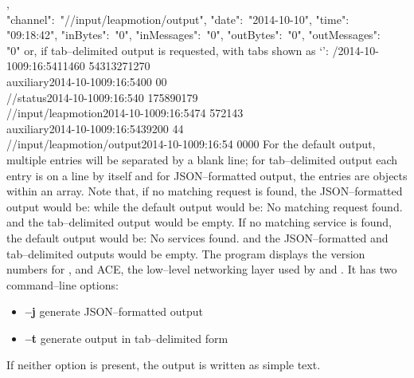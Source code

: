 \textbraceright,\\
\textbraceleft{} "channel":\ "/\serviceName/input/leapmotion/output", "date":\
"2014-10-10", "time":\ \\
"09:18:42", "inBytes":\ "0", "inMessages":\ "0", "outBytes":\ "0", "outMessages":\ \\
"0" \textbraceright{} \closeSq{} \closeSq
\outputEnd{}
or, if tab--delimited output is requested, with tabs shown as
`\texttt{\boldmath{$\vdash$}}':
\outputBegin{}
/\dollarService\pseudotab{}2014-10-10\pseudotab{}09:16:54\pseudotab{}11460%
\pseudotab{}54313\pseudotab{}271\pseudotab{}270\\
auxiliary\pseudotab{}2014-10-10\pseudotab{}09:16:54\pseudotab{}0\pseudotab{}0\pseudotab{}%
0\pseudotab{}0\\
/\dollarService/status\pseudotab{}2014-10-10\pseudotab{}09:16:54\pseudotab{}0%
\pseudotab{}17589\pseudotab{}0\pseudotab{}179\\
/\serviceName/input/leapmotion\pseudotab{}2014-10-10\pseudotab{}09:16:54\pseudotab{}74%
\pseudotab{}5721\pseudotab{}4\pseudotab{}3\\
auxiliary\pseudotab{}2014-10-10\pseudotab{}09:16:54\pseudotab{}39\pseudotab{}200%
\pseudotab{}4\pseudotab{}4\\
/\serviceName/input/leapmotion/output\pseudotab{}2014-10-10\pseudotab{}09:16:54%
\pseudotab{}0\pseudotab{}0\pseudotab{}0\pseudotab{}0
\outputEnd{}
For the default output, multiple entries will be separated by a blank line; for
tab--delimited output each entry is on a line by itself and for JSON--formatted output,
the entries are objects within an array.
Note that, if no matching request is found, the JSON--formatted output would be:
\outputBegin{}
\sqPair
\outputEnd{}
while the default output would be:
\outputBegin{}
No matching request found.
\outputEnd{}
and the tab--delimited output would be empty.
If no matching service is found, the default output would be:
\outputBegin{}
No services found.
\outputEnd{}
and the JSON--formatted and tab--delimited outputs would be empty.
\tertiaryEnd{\utilityNameE{mpmServiceMetrics}}
\newpage
{}
The program  displays the version numbers for \mplusm{}, \yarp{}
and ACE, the low--level networking layer used by \mplusm{} and \yarp{}.
It has two command--line options:
\begin{itemize}
\item \textbf{--j} generate JSON--formatted output
\item \textbf{--t} generate output in tab--delimited form
\end{itemize}
If neither option is present, the output is written as simple text.\\

